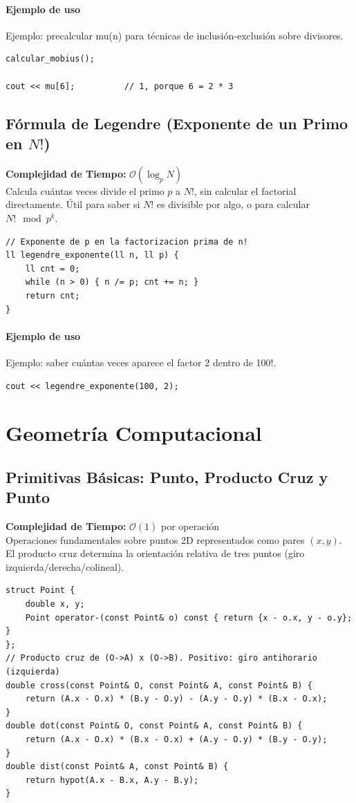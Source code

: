\documentclass[10pt,twocolumn,letterpaper]{report}
\begin{document}
\subsubsection*{Ejemplo de uso}
Ejemplo: precalcular mu(n) para técnicas de inclusión-exclusión sobre divisores.
\begin{lstlisting}
calcular_mobius();

cout << mu[6];          // 1, porque 6 = 2 * 3
\end{lstlisting}

\section{Fórmula de Legendre (Exponente de un Primo en $N!$)}
\textbf{Complejidad de Tiempo:} $\mathcal{O}(\log_p N)$ \\
Calcula cuántas veces divide el primo $p$ a $N!$, sin calcular el factorial directamente. Útil para saber si $N!$ es divisible por algo, o para calcular $N! \mod p^k$.
\begin{lstlisting}
// Exponente de p en la factorizacion prima de n!
ll legendre_exponente(ll n, ll p) {
    ll cnt = 0;
    while (n > 0) { n /= p; cnt += n; }
    return cnt;
}
\end{lstlisting}
\subsubsection*{Ejemplo de uso}
Ejemplo: saber cuántas veces aparece el factor 2 dentro de 100!.
\begin{lstlisting}
cout << legendre_exponente(100, 2);
\end{lstlisting}

\chapter{Geometría Computacional}
\section{Primitivas Básicas: Punto, Producto Cruz y Punto}
\textbf{Complejidad de Tiempo:} $\mathcal{O}(1)$ por operación \\
Operaciones fundamentales sobre puntos 2D representados como pares $(x, y)$. El producto cruz determina la orientación relativa de tres puntos (giro izquierda/derecha/colineal).
\begin{lstlisting}
struct Point {
    double x, y;
    Point operator-(const Point& o) const { return {x - o.x, y - o.y}; }
};
// Producto cruz de (O->A) x (O->B). Positivo: giro antihorario (izquierda)
double cross(const Point& O, const Point& A, const Point& B) {
    return (A.x - O.x) * (B.y - O.y) - (A.y - O.y) * (B.x - O.x);
}
double dot(const Point& O, const Point& A, const Point& B) {
    return (A.x - O.x) * (B.x - O.x) + (A.y - O.y) * (B.y - O.y);
}
double dist(const Point& A, const Point& B) {
    return hypot(A.x - B.x, A.y - B.y);
}
\end{lstlisting}
\end{document}
